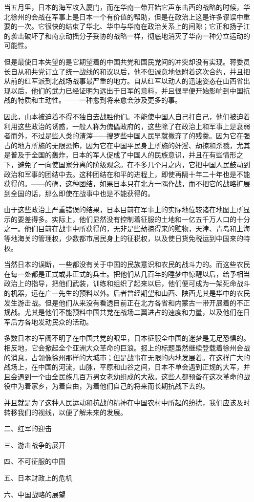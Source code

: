 \documentclass[10pt]{book}
\begin{document}
当五月里，日本的海军攻入厦门，而在华南一带开始它声东击西的战略的时候，华北徐州的会战在军事上是日本一个有价值的帮助，但是在政治上这是许多谬误中重要的一次。它很快的结束了华北、华中与华南在政治关系上的间隙；它正和扬子江的袭击破坏了和南京动摇分子妥协的战略一样，彻底地消灭了华南一种分立运动的可能性。

但是最使日本失望的是它期望着的中国共党和国民党间的冲突却没有实现。蒋委员长自从和共党订立了统一战线的和议以后，他不但诚意地依附着这次合约，并且把从前的红军派到北战场战事最严重的地方。自从红军以动人的迅速姿态在山西省出现以后，他们的武力已经证明为远出于日军的意料，并且很早便开始影响到中国抗战的特质和主动性。——一种愈到将来愈会涉及更多的事。

因此，山本被迫着不得不独自去战胜他们。不能使中国人自己打自己，他们被迫着利用这些政治的诱惑，一般人称为傀儡政府的，这些除了在政治上和军事上是衰弱者而外，不过是些人类的渣滓——搜罗些中国人民早就撇弃了的残羹。因为它在强占的地方所施的无限恐怖，因为它在中国平民身上所施的奸淫、劫掠和杀戮，尤其是普及于全国的轰炸，日本的军人促成了中国人的民族意识，并且在有些情形之下，避免了一向使国家分离的阶级观念。在不多几个月之内，它把中国人民鼓动到政治和军事的团结中去。这种团结在和平的进程上，即使再隔十年二十年也是不能获得的。——的确，这种团结，如果日本只在北方一隅作战，而不把它的战略扩展到全国的话，那么即使在战事中也是不能获得的。

由于这些政治上严重错误的结果，日本目前在军事上的实际地位较诸在地图上所显示的要差得多。实际上，他们显然没有控制着征服的土地和一亿五千万人口的十分之一。他们目前在战事中所获得的，无非是些劫掠得来的赃物，天津、青岛和上海等地海关的管理权，少数都市居民身上的征税权，以及使日货免税运到中国来的特权。

当然日本的误断，一些都没有关于中国的民族意识和农民的战斗力的。而这些农民在每一处都是正式或非正式的兵士。把他们从几百年的睡梦中惊醒以后，给予相当政治上的指导，把他们武装，训练和组织了起来以后，他们便可成为一架死命战斗的机器，远在广一先生的预料以外。后者曾经期望和山西、陕西尤其是华中的农民发生游击战。但是他们从来没有看透目前正在北方各省和内蒙古一带开展着的不正规战。尤其是他们不能预料中国共党在战场二翼进占的速度和力量，以及他们在日军后方各地发动民众的活动。

多数日本的军阀不明了在中国共党的眼里，日本征服全中国的迷梦是无足恐惧的。相反地，它会掀起全个亚洲大众革命的巨浪。报上的标题虽然继续登载着徐州会战的消息，占领像徐州那样的大城市；但是战事在无限的内地发展着。在这样广大的战场上，在中国的河流，山脉，平原和山谷之间，日本不单会遇到正规的大军，并且会遇到一个由全民族几百万男女老幼组成的大敌。这些人都预备在这次革命的战役中为着家乡，为着自由，为着他们自己的将来而长期抗战下去的。

并且就是为了这种人民运动和抗战的精神在中国农村中所起的纷扰，我们应该及时转移我们的视线，以便了解未来的发展。

二、红军的迎击

三、游击战争的展开

四、不可征服的中国

五、日本财政上的危机

六、中国战略的展望
\end{document}
